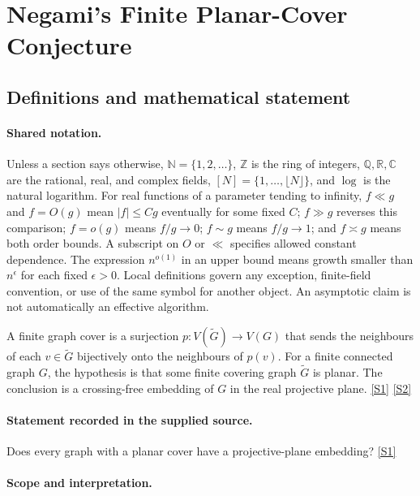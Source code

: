 \documentclass[11pt,a4paper]{article}
\newcommand{\N}{\mathbb{N}}
\newcommand{\Z}{\mathbb{Z}}
\newcommand{\Q}{\mathbb{Q}}
\newcommand{\R}{\mathbb{R}}
\newcommand{\C}{\mathbb{C}}
\newcommand{\sref}[2]{\hyperlink{source:#1:#2}{[S#2]}}
\begin{document}
\section{Negami’s Finite Planar-Cover Conjecture}\label{statement}


\subsection{Definitions and mathematical statement}

\paragraph{Shared notation.}Unless a section says otherwise, $\N=\{1,2,\ldots\}$,
$\Z$ is the ring of integers, $\Q,\R,\C$ are the rational, real, and complex
fields, $[N]=\{1,\ldots,\lfloor N\rfloor\}$, and $\log$ is the natural
logarithm. For real functions of a parameter tending to infinity,
$f\ll g$ and $f=O(g)$ mean $|f|\leq Cg$ eventually for some fixed $C$;
$f\gg g$ reverses this comparison; $f=o(g)$ means $f/g\to0$;
$f\sim g$ means $f/g\to1$; and $f\asymp g$ means both order bounds.
A subscript on $O$ or $\ll$ specifies allowed constant dependence.
The expression $n^{o(1)}$ in an upper bound means growth smaller than
$n^\epsilon$ for each fixed $\epsilon>0$. Local definitions govern any
exception, finite-field convention, or use of the same symbol for another
object. An asymptotic claim is not automatically an effective algorithm.



A finite graph cover is a surjection $p:V(\widetilde G)\to V(G)$ that sends the neighbours of each $v\in\widetilde G$ bijectively onto the neighbours of $p(v)$. For a finite connected graph $G$, the hypothesis is that some finite covering graph $\widetilde G$ is planar. The conclusion is a crossing-free embedding of $G$ in the real projective plane. \sref{statement}{1} \sref{statement}{2}

\paragraph{Statement recorded in the supplied source.}
Does every graph with a planar cover have a projective-plane embedding? \sref{statement}{1}

\paragraph{Scope and interpretation.}
\end{document}
